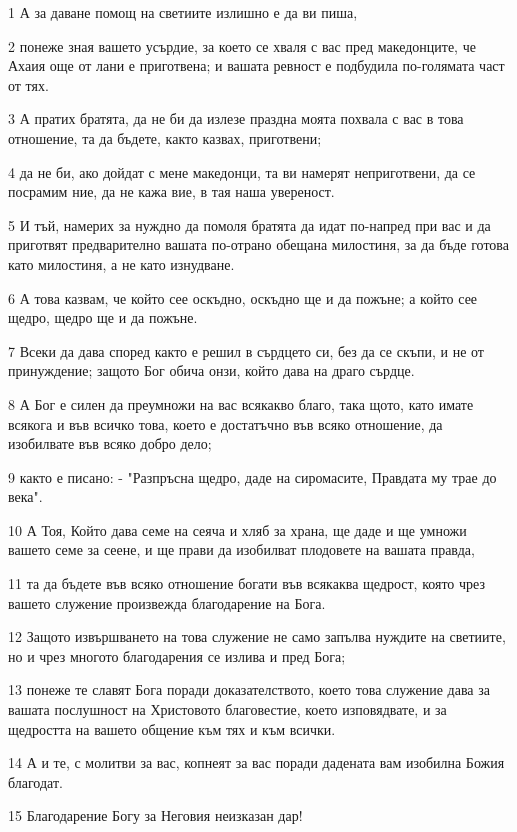 \par 1 А за даване помощ на светиите излишно е да ви пиша,
\par 2 понеже зная вашето усърдие, за което се хваля с вас пред македонците, че Ахаия още от лани е приготвена; и вашата ревност е подбудила по-голямата част от тях.
\par 3 А пратих братята, да не би да излезе праздна моята похвала с вас в това отношение, та да бъдете, както казвах, приготвени;
\par 4 да не би, ако дойдат с мене македонци, та ви намерят неприготвени, да се посрамим ние, да не кажа вие, в тая наша увереност.
\par 5 И тъй, намерих за нуждно да помоля братята да идат по-напред при вас и да приготвят предварително вашата по-отрано обещана милостиня, за да бъде готова като милостиня, а не като изнудване.
\par 6 А това казвам, че който сее оскъдно, оскъдно ще и да пожъне; а който сее щедро, щедро ще и да пожъне.
\par 7 Всеки да дава според както е решил в сърдцето си, без да се скъпи, и не от принуждение; защото Бог обича онзи, който дава на драго сърдце.
\par 8 А Бог е силен да преумножи на вас всякакво благо, така щото, като имате всякога и във всичко това, което е достатъчно във всяко отношение, да изобилвате във всяко добро дело;
\par 9 както е писано: - "Разпръсна щедро, даде на сиромасите, Правдата му трае до века".
\par 10 А Тоя, Който дава семе на сеяча и хляб за храна, ще даде и ще умножи вашето семе за сеене, и ще прави да изобилват плодовете на вашата правда,
\par 11 та да бъдете във всяко отношение богати във всякаква щедрост, която чрез вашето служение произвежда благодарение на Бога.
\par 12 Защото извършването на това служение не само запълва нуждите на светиите, но и чрез многото благодарения се излива и пред Бога;
\par 13 понеже те славят Бога поради доказателството, което това служение дава за вашата послушност на Христовото благовестие, което изповядвате, и за щедростта на вашето общение към тях и към всички.
\par 14 А и те, с молитви за вас, копнеят за вас поради дадената вам изобилна Божия благодат.
\par 15 Благодарение Богу за Неговия неизказан дар!

